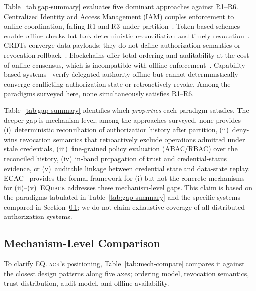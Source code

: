 \documentclass[10pt,journal,compsoc]{IEEEtran}
\newcommand{\equack}{\textsc{EQuack}}
\begin{document}
Table~\ref{tab:gap-summary} evaluates five dominant approaches against R1--R6. Centralized Identity and Access Management (IAM) couples enforcement to online coordination, failing R1 and R3 under partition~\cite{jacob2024eventuallyac}. Token-based schemes enable offline checks but lack deterministic reconciliation and timely revocation~\cite{rouhani2021distributed}. CRDTs converge data payloads; they do not define authorization semantics or revocation rollback~\cite{shapiro2011crdt,gomes2017_sec}. Blockchains offer total ordering and auditability at the cost of online consensus, which is incompatible with offline enforcement~\cite{8989788,9020182,9446108,8798730,9548956,DIFRANCESCOMAESA201993,s20010282,s22031271}. Capability-based systems~\cite{birgisson2014macaroons,ucan2022,andersen2019wave} verify delegated authority offline but cannot deterministically converge conflicting authorization state or retroactively revoke. Among the paradigms surveyed here, none simultaneously satisfies R1--R6.

Table~\ref{tab:gap-summary} identifies which \emph{properties}
each paradigm satisfies. The deeper gap is mechanism-level; among
the approaches surveyed, none provides
(i)~deterministic reconciliation of authorization history after
    partition,
(ii)~deny-wins revocation semantics that retroactively exclude
    operations admitted under stale credentials,
(iii)~fine-grained policy evaluation (ABAC/RBAC) over the
    reconciled history,
(iv)~in-band propagation of trust and credential-status evidence,
    or
(v)~auditable linkage between credential state and data-state
    replay.
ECAC~\cite{jacob2024eventuallyac} provides the formal framework
for (i) but not the concrete mechanisms for (ii)--(v). \equack{}
addresses these mechanism-level gaps. This claim is based on the
paradigms tabulated in Table~\ref{tab:gap-summary} and the
specific systems compared in
Section~\ref{subsec:mechanism-comparison}; we do not claim
exhaustive coverage of all distributed authorization systems.

\subsection{Mechanism-Level Comparison}\label{subsec:mechanism-comparison}

To clarify \equack{}'s positioning, Table~\ref{tab:mech-compare} compares it against the closest design patterns along five axes; ordering model, revocation semantics, trust distribution, audit model, and offline availability.
\end{document}
